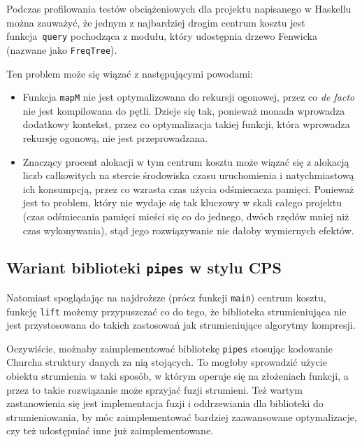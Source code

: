 \documentclass[../../praca.tex]{subfiles}
\begin{document}
Podczas profilowania testów obciążeniowych dla projektu napisanego w Haskellu
można zauważyć, że jednym z najbardziej drogim centrum kosztu jest
funkcja~\texttt{query} pochodząca z modułu, który udostępnia
drzewo Fenwicka (nazwane jako \texttt{FreqTree}). 

Ten problem może się wiązać z następującymi powodami:
\begin{itemize}
  \item Funkcja \texttt{mapM} nie jest optymalizowana do rekursji ogonowej,
    przez co \emph{de facto} nie jest kompilowana do pętli. Dzieje się tak,
    ponieważ monada wprowadza dodatkowy kontekst, przez co optymalizacja
    takiej funkcji, która wprowadza rekursję ogonową, nie jest przeprowadzana.
  \item Znaczący procent alokacji w tym centrum kosztu może wiązać się z
    alokacją liczb całkowitych na stercie środowiska czasu uruchomienia
    i natychmiastową ich konsumpcją, przez co wzrasta czas użycia odśmiecacza
    pamięci. Ponieważ jest to problem, który nie wydaje się tak kluczowy
    w skali całego projektu (czas odśmiecania pamięci mieści się co do
    jednego, dwóch rzędów mniej niż czas wykonywania), stąd jego rozwiązywanie
    nie dałoby wymiernych efektów.
\end{itemize}

\subsection{Wariant biblioteki \texttt{pipes} w stylu CPS}

Natomiast spoglądając na najdroższe (prócz funkcji \texttt{main}) centrum kosztu,
funkcję \texttt{lift} możemy przypuszczać co do tego, że biblioteka strumieniująca
nie jest przystosowana do takich zastosowań jak strumieniujące algorytmy
kompresji.

Oczywiście, możnaby zaimplementować bibliotekę \texttt{pipes}
stosując kodowanie Churcha struktury danych za nią stojących.
To mogłoby sprowadzić użycie obiektu strumienia w taki sposób, w którym
operuje się na złożeniach funkcji, a przez to takie rozwiązanie może sprzyjać
fuzji strumieni.
Też wartym zastanowienia się jest implementacja fuzji i oddrzewiania
dla biblioteki do strumieniowania, by móc zaimplementować bardziej
zaawansowane optymalizacje, czy też udostępniać inne już zaimplementowane.
\end{document}
